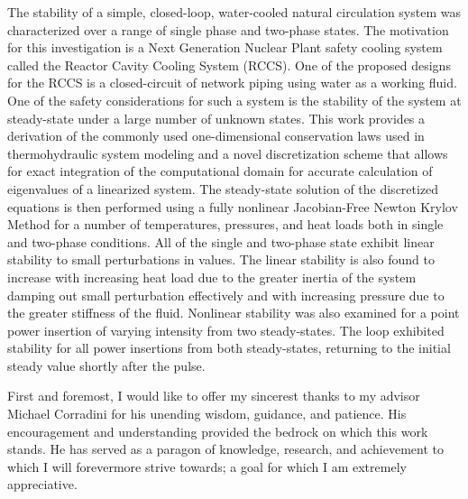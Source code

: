 \documentclass{UWMadThesis}
\begin{document}
    \MakeTitlePage{}
    \begin{LicensePage}
        \CreativeCommons
        \Attribution
        \NonCommercial
        \ShareAlike
    \end{LicensePage}


\abstract{}
The stability of a simple, closed-loop, water-cooled natural circulation system was characterized over a range of single phase and two-phase states.
The motivation for this investigation is a Next Generation Nuclear Plant safety cooling system called the Reactor Cavity Cooling System (RCCS).
One of the proposed designs for the RCCS is a closed-circuit of network piping using water as a working fluid.  One of the safety considerations for such a system is the stability of the system at steady-state under a large number of unknown states.
This work provides a derivation of the commonly used one-dimensional conservation laws used in thermohydraulic system modeling and a novel discretization scheme that allows for exact integration of the computational domain for accurate calculation of eigenvalues of a linearized system.
The steady-state solution of the discretized equations is then performed using a fully nonlinear Jacobian-Free Newton Krylov Method for a number of temperatures, pressures, and heat loads both in single and two-phase conditions.
All of the single and two-phase state exhibit linear stability to small perturbations in values.
The linear stability is also found to increase with increasing heat load due to the greater inertia of the system damping out small perturbation effectively and with increasing pressure due to the greater stiffness of the fluid.
Nonlinear stability was also examined for a point power insertion of varying intensity from two steady-states.
The loop exhibited stability for all power insertions from both steady-states, returning to the initial steady value shortly after the pulse.



\acknowledgments{}
First and foremost, I would like to offer my sincerest thanks to my advisor Michael Corradini for his unending wisdom, guidance, and patience.
His encouragement and understanding provided the bedrock on which this work stands.
He has served as a paragon of knowledge, research, and achievement to which I will forevermore strive towards; a goal for which I am extremely appreciative.
\end{document}
